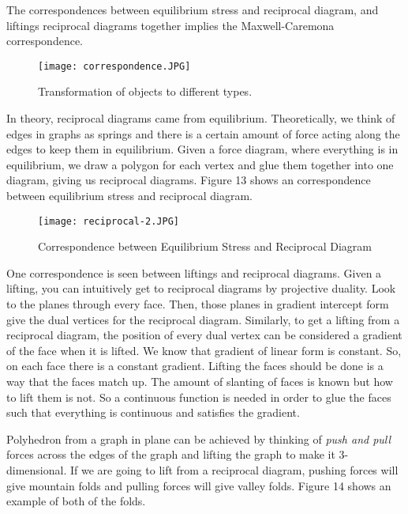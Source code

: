 \documentclass{article}
\begin{document}
    \newpage
    
    The correspondences between equilibrium stress and reciprocal diagram, and liftings reciprocal diagrams together implies the Maxwell-Caremona correspondence. 
    
    \begin{figure}[h!]
        \centering
        \texttt{[image: correspondence.JPG]}
        \caption{Transformation of objects to different types.}
    \end{figure}
    
    In theory, reciprocal diagrams came from equilibrium. Theoretically, we think of edges in graphs as springs and there is a certain amount of force acting along the edges to keep them in equilibrium. Given a force diagram, where everything is in equilibrium, we draw a polygon for each vertex and glue them together into one diagram, giving us reciprocal diagrams. Figure 13 shows an correspondence between equilibrium stress and reciprocal diagram. 
    
    \begin{figure}[H]
        \centering
        \texttt{[image: reciprocal-2.JPG]}
        \caption{Correspondence between Equilibrium Stress and Reciprocal Diagram}
        \label{fig:reciprocal-corres}
    \end{figure}
    
    One correspondence is seen between liftings and reciprocal diagrams. Given a lifting, you can intuitively get to reciprocal diagrams by projective duality. Look to the planes through every face. Then, those planes in gradient intercept form give the dual vertices for the reciprocal diagram. Similarly, to get a lifting from a reciprocal diagram, the position of every dual vertex can be considered a gradient of the face when it is lifted. We know that gradient of linear form is constant. So, on each face there is a constant gradient. Lifting the faces should be done is a way that the faces match up. The amount of slanting of faces is known but how to lift them is not. So a continuous function is needed in order to glue the faces such that everything is continuous and satisfies the gradient. 
    
    Polyhedron from a graph in plane can be achieved by thinking of \textit{push and pull} forces across the edges of the graph and lifting the graph to make it 3-dimensional. If we are going to lift from a reciprocal diagram, pushing forces will give mountain folds and pulling forces will give valley folds. Figure 14 shows an example of both of the folds.
    
\end{document}

